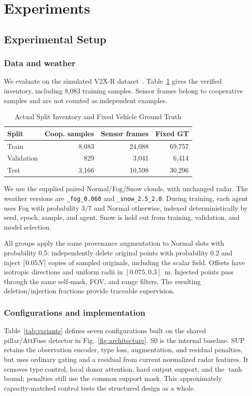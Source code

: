 \section{Experiments}
\subsection{Experimental Setup}\label{sec:setup}
\subsubsection{Data and weather}
We evaluate on the simulated V2X-R dataset~\cite{v2xr}. Table~\ref{tab:data} gives the verified inventory, including 8,083 training samples. Sensor frames belong to cooperative samples and are not counted as independent examples.

\begin{table}[b]
\caption{Actual Split Inventory and Fixed Vehicle Ground Truth}
\label{tab:data}
\centering
\begin{tabular}{|l|r|r|r|}
\hline
Split & Coop. samples & Sensor frames & Fixed GT \\
\hline
Train & 8,083 & 24,088 & 69,757 \\
Validation & 829 & 3,041 & 6,414 \\
Test & 3,166 & 10,598 & 30,296 \\
\hline
\end{tabular}
\end{table}

We use the supplied paired Normal/Fog/Snow clouds, with unchanged radar. The weather versions are \texttt{\_fog\_0.060} and \texttt{\_snow\_2.5\_2.0}. During training, each agent uses Fog with probability $3/7$ and Normal otherwise, indexed deterministically by seed, epoch, sample, and agent. Snow is held out from training, validation, and model selection.

All groups apply the same provenance augmentation to Normal slots with probability 0.5: independently delete original points with probability 0.2 and inject $\lceil0.05N\rceil$ copies of sampled originals, including the scalar field. Offsets have isotropic directions and uniform radii in $[0.075,0.3]$~m. Injected points pass through the same self-mask, FOV, and range filters. The resulting deletion/injection fractions provide traceable supervision.

\subsubsection{Configurations and implementation}
Table~\ref{tab:variants} defines seven configurations built on the shared pillar/AttFuse detector in Fig.~\ref{fig:architecture}. S0 is the internal baseline. SUP retains the observation encoder, type loss, augmentation, and residual penalties, but uses ordinary gating and a residual from current normalized radar features. It removes type control, local donor attention, hard output support, and the $\tanh$ bound; penalties still use the common support mask. This approximately capacity-matched control tests the structured design as a whole.

